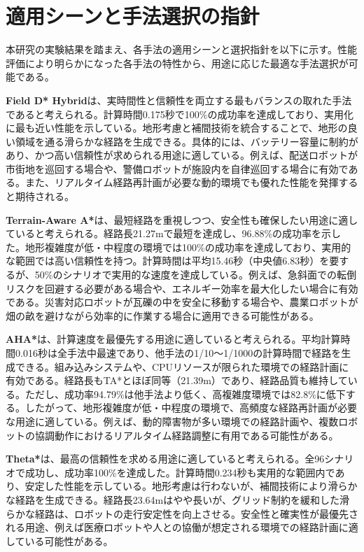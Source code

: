\section{適用シーンと手法選択の指針}

本研究の実験結果を踏まえ、各手法の適用シーンと選択指針を以下に示す。性能評価により明らかになった各手法の特性から、用途に応じた最適な手法選択が可能である。

\textbf{Field D* Hybrid}は、実時間性と信頼性を両立する最もバランスの取れた手法であると考えられる。計算時間0.175秒で100\%の成功率を達成しており、実用化に最も近い性能を示している。地形考慮と補間技術を統合することで、地形の良い領域を通る滑らかな経路を生成できる。具体的には、バッテリー容量に制約があり、かつ高い信頼性が求められる用途に適している。例えば、配送ロボットが市街地を巡回する場合や、警備ロボットが施設内を自律巡回する場合に有効である。また、リアルタイム経路再計画が必要な動的環境でも優れた性能を発揮すると期待される。

\textbf{Terrain-Aware A*}は、最短経路を重視しつつ、安全性も確保したい用途に適していると考えられる。経路長21.27mで最短を達成し、96.88\%の成功率を示した。地形複雑度が低・中程度の環境では100\%の成功率を達成しており、実用的な範囲では高い信頼性を持つ。計算時間は平均15.46秒（中央値6.83秒）を要するが、50\%のシナリオで実用的な速度を達成している。例えば、急斜面での転倒リスクを回避する必要がある場合や、エネルギー効率を最大化したい場合に有効である。災害対応ロボットが瓦礫の中を安全に移動する場合や、農業ロボットが畑の畝を避けながら効率的に作業する場合に適用できる可能性がある。

\textbf{AHA*}は、計算速度を最優先する用途に適していると考えられる。平均計算時間0.016秒は全手法中最速であり、他手法の1/10～1/1000の計算時間で経路を生成できる。組み込みシステムや、CPUリソースが限られた環境での経路計画に有効である。経路長もTA*とほぼ同等（21.39m）であり、経路品質も維持している。ただし、成功率94.79\%は他手法より低く、高複雑度環境では82.8\%に低下する。したがって、地形複雑度が低・中程度の環境で、高頻度な経路再計画が必要な用途に適している。例えば、動的障害物が多い環境での経路計画や、複数ロボットの協調動作におけるリアルタイム経路調整に有用である可能性がある。

\textbf{Theta*}は、最高の信頼性を求める用途に適していると考えられる。全96シナリオで成功し、成功率100\%を達成した。計算時間0.234秒も実用的な範囲内であり、安定した性能を示している。地形考慮は行わないが、補間技術により滑らかな経路を生成できる。経路長23.64mはやや長いが、グリッド制約を緩和した滑らかな経路は、ロボットの走行安定性を向上させる。安全性と確実性が最優先される用途、例えば医療ロボットや人との協働が想定される環境での経路計画に適している可能性がある。

